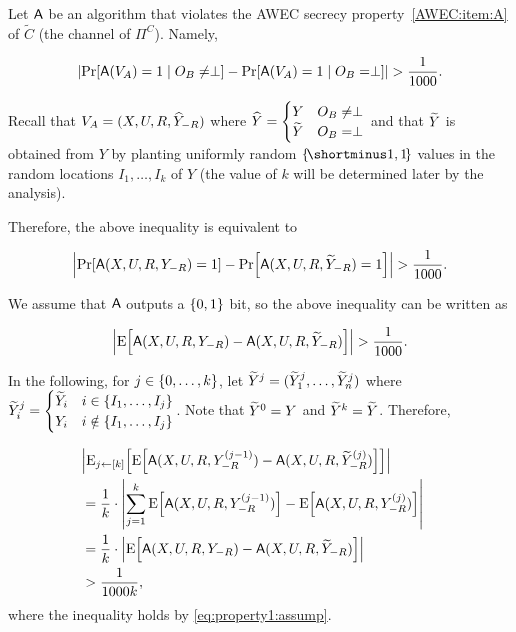Let $\mathsf{A}$ be an algorithm that violates the AWEC secrecy property~\ref{AWEC:item:A} of $\tilde{C}$ (the channel of $\Pi^C$). Namely,

\begin{align*}
	\size{\pr{\Ac(V_A) = 1 \mid O_B \neq \perp} - \pr{\Ac(V_A) = 1 \mid O_B = \perp}} > \frac1{1000}.
\end{align*}

Recall that $V_A = (X,U,R,\widehat{Y}_{-R})$ where $\widehat{Y} = \begin{cases} Y & O_B \neq \perp \\ \widetilde{Y} & O_B = \perp\end{cases}$ and that $\widetilde{Y}$ is obtained from $Y$ by planting uniformly random $\oo$ values in the random locations $I_1,\ldots, I_k$ of $Y$ (the value of $k$ will be determined later by the analysis).

Therefore, the above inequality is equivalent to 

\begin{align*}%
	\size{\pr{\Ac(X,U,R,Y_{-R}) = 1} - \pr{\Ac(X,U,R,\tY_{-R}) = 1}} > \frac1{1000}.
\end{align*}

We assume \wlg that $\mathsf{A}$ outputs a $\zo$ bit, so the above inequality can be written as

\begin{align}\label{eq:property1:assump}
	\size{\ex{\Ac(X,U,R,Y_{-R}) - \Ac(X,U,R,\tY_{-R})}} > \frac1{1000}.
\end{align}


In the following, for $j \in \set{0,\ldots,k}$, let $\widetilde{Y}^{j} = (\widetilde{Y}^{j}_1,\ldots, \widetilde{Y}^{j}_n)$ where $\tY^{j}_i = \begin{cases} \tY_i & i \in \set{I_1,\ldots,I_j} \\ Y_i & i \notin \set{I_1,\ldots,I_j}\end{cases}$.
Note that $\widetilde{Y}^{0} = Y$ and $\widetilde{Y}^{k} = \widetilde{Y}$. Therefore,

\begin{align}\label{eq:property1:hybrid}
    \lefteqn{\size{\eex{j \la [k]}{\ex{\Ac(X,U,R,Y^{(j-1)}_{-R}) - \Ac(X,U,R,\tY^{(j)}_{-R})}}}}\\
    &= \frac1k \cdot \size{\sum_{j=1}^k \ex{\Ac(X,U,R,Y^{(j-1)}_{-R})} - \ex{\Ac(X,U,R,Y^{(j)}_{-R})}}\nonumber\\
    &= \frac1k \cdot \size{\ex{\Ac(X,U,R,Y_{-R}) - \Ac(X,U,R,\tY_{-R})}}\nonumber\\
    &> \frac1{1000 k},\nonumber
\end{align}
where the inequality holds by \cref{eq:property1:assump}.

